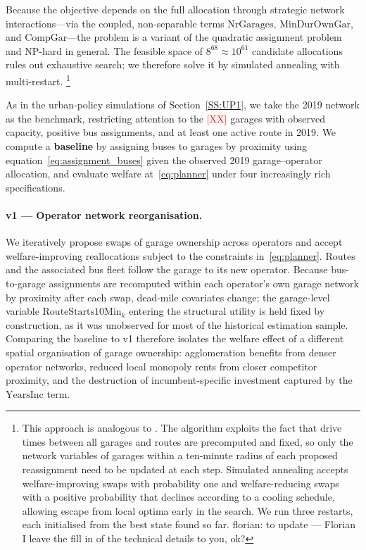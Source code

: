 \documentclass[12pt]{article}
\newcommand{\florian}[1]{\textcolor[rgb]{0,0.5,0.99}{florian: #1}}
\begin{document}
Because the objective depends on the full allocation through strategic network
interactions---via the coupled, non-separable terms $\mathrm{NrGarages}$,
$\mathrm{MinDurOwnGar}$, and $\mathrm{CompGar}$---the problem is a variant of
the quadratic assignment problem and NP-hard in general. The feasible space of
$8^{68} \approx 10^{61}$ candidate allocations rules out exhaustive search; we
therefore solve it by simulated annealing with multi-restart.%
\footnote{This approach is analogous to \citet{kreindler2024optimal}. The
algorithm exploits the fact that drive times between all garages and routes are
precomputed and fixed, so only the network variables of garages within a
ten-minute radius of each proposed reassignment need to be updated at each
step. Simulated annealing accepts welfare-improving swaps with probability one
and welfare-reducing swaps with a positive probability that declines according
to a cooling schedule, allowing escape from local optima early in the search.
We run three restarts, each initialised from the best state found so far. \florian{to update --- Florian I leave the fill in of the technical details to you, ok?}}
 
As in the urban-policy simulations of Section~\ref{SS:UP1}, we take the 2019
network as the benchmark, restricting attention to the \textcolor{red}{[XX]}
garages with observed capacity, positive bus assignments, and at least one
active route in 2019. We compute a \textbf{baseline} by assigning buses to
garages by proximity using equation~\eqref{eq:assignment_buses} given the
observed 2019 garage--operator allocation, and evaluate welfare
at~\eqref{eq:planner} under four increasingly rich specifications.
 
\paragraph{v1 --- Operator network reorganisation.}
We iteratively propose swaps of garage ownership across operators and accept
welfare-improving reallocations subject to the constraints
in~\eqref{eq:planner}. Routes and the associated bus fleet follow the garage
to its new operator. Because bus-to-garage assignments are recomputed within
each operator's own garage network by proximity after each swap, dead-mile
covariates change; the garage-level variable $\mathrm{RouteStarts10Min}_k$
entering the structural utility is held fixed by construction, as it was
unobserved for most of the historical estimation sample. Comparing the
baseline to v1 therefore isolates the welfare effect of a different spatial
organisation of garage ownership: agglomeration benefits from denser operator
networks, reduced local monopoly rents from closer competitor proximity, and
the destruction of incumbent-specific investment captured by the
$\mathrm{YearsInc}$ term.
 
\end{document}
